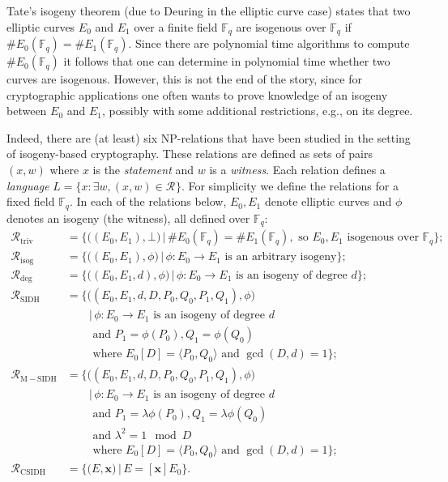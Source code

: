 \documentclass{llncs}
\newcommand{\F}{\ensuremath{\mathbb{F}}}
\newcommand{\R}[1][]{\ensuremath{\mathcal{R}_{\mathrm{#1}}}}
\newcommand{\bx}{\mathbf{x}}
\begin{document}
Tate's isogeny theorem (due to Deuring in the elliptic curve case) states that two elliptic curves $E_0$ and $E_1$ over a finite field $\F_q$ are isogenous over $\F_q$ if $\#E_0( \F_q ) = \#E_1(\F_q)$. Since there are  polynomial time algorithms to compute $\#E_0( \F_q )$ it follows that one can determine in polynomial time whether two curves are isogenous. However, this is not the end of the story, since for cryptographic applications one often wants to prove knowledge of an isogeny between $E_0$ and $E_1$, possibly with some additional restrictions, e.g., on its degree.

Indeed, there are (at least) six NP-relations that have been studied in the setting of isogeny-based cryptography.
These relations are defined as sets of pairs $(x,w)$ where $x$ is the \emph{statement} and $w$ is a \emph{witness}.
Each relation defines a \emph{language} $L = \{ x : \exists w, (x,w) \in \R \}$.
For simplicity we define the relations for a fixed field $\F_q$.
In each of the relations below, $E_0,E_1$ denote elliptic curves and $\phi$ denotes an isogeny (the witness), all defined over $\F_q$:
\begin{align*}
    \R[triv] &= \bigl\{ \bigl((E_0, E_1), \bot \bigr) \,\big\vert\, \#E_0( \F_q ) = \#E_1(\F_q), \text{ so } E_0, E_1 \text{ isogenous over } \F_q \bigr\};\\
    \R[isog]  &= \bigl\{ \bigl((E_0, E_1),\phi \bigr) \,\big\vert\, \phi : E_0 \to E_1 \text{ is an arbitrary isogeny}\bigr\};\\
    \R[deg]   &= \bigl\{ \bigl((E_0, E_1, d), \phi\bigr) \,\big\vert\, \phi : E_0 \to E_1 \text{ is an isogeny of degree } d \bigr\};\\
    \R[SIDH]  &= \bigl\{ \bigl((E_0, E_1, d, D, P_0, Q_0, P_1, Q_1 ),\phi \bigr) \\
              &\qquad \big\vert\, \phi : E_0 \to E_1 \text{ is an isogeny of degree } d \\
              &\qquad \text{ and } P_1 = \phi(P_0), Q_1 = \phi(Q_0) \\
              &\qquad \text{ where } E_0[D] = \langle P_0, Q_0\rangle  \text{ and } \gcd(D,d) = 1 \bigr\} ;\\
    \R[M-SIDH]&= \bigl\{ \bigl((E_0, E_1, d, D, P_0, Q_0, P_1, Q_1 ),\phi \bigr) \\
              &\qquad \big\vert\, \phi : E_0 \to E_1 \text{ is an isogeny of degree } d \\
              &\qquad \text{ and } P_1 = \lambda\phi(P_0), Q_1 = \lambda\phi(Q_0) \\
              &\qquad \text{ and } \lambda^2 = 1 \mod D \\
              &\qquad \text{ where } E_0[D] = \langle P_0, Q_0\rangle  \text{ and } \gcd(D,d) = 1 \bigr\} ;\\
    \R[CSIDH] &= \bigl\{ \bigl( E,\bx \bigr)   \,\big\vert\, E = [\bx]E_0 
    \bigr\}.
\end{align*}
\end{document}
